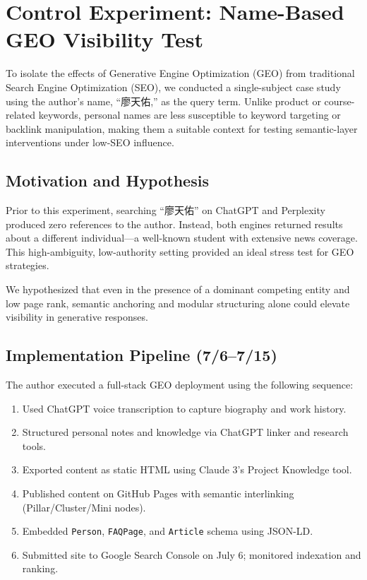 \section{Control Experiment: Name-Based GEO Visibility Test}

To isolate the effects of Generative Engine Optimization (GEO) from traditional Search Engine Optimization (SEO), we conducted a single-subject case study using the author’s name, “廖天佑,” as the query term. Unlike product or course-related keywords, personal names are less susceptible to keyword targeting or backlink manipulation, making them a suitable context for testing semantic-layer interventions under low-SEO influence.

\subsection{Motivation and Hypothesis}

Prior to this experiment, searching “廖天佑” on ChatGPT and Perplexity produced zero references to the author. Instead, both engines returned results about a different individual---a well-known student with extensive news coverage. This high-ambiguity, low-authority setting provided an ideal stress test for GEO strategies.

We hypothesized that even in the presence of a dominant competing entity and low page rank, semantic anchoring and modular structuring alone could elevate visibility in generative responses.

\subsection{Implementation Pipeline (7/6--7/15)}

The author executed a full-stack GEO deployment using the following sequence:

\begin{enumerate}
  \item Used ChatGPT voice transcription to capture biography and work history.
  \item Structured personal notes and knowledge via ChatGPT linker and research tools.
  \item Exported content as static HTML using Claude 3’s Project Knowledge tool.
  \item Published content on GitHub Pages with semantic interlinking (Pillar/Cluster/Mini nodes).
  \item Embedded \texttt{Person}, \texttt{FAQPage}, and \texttt{Article} schema using JSON-LD.
  \item Submitted site to Google Search Console on July 6; monitored indexation and ranking.
\end{enumerate}


